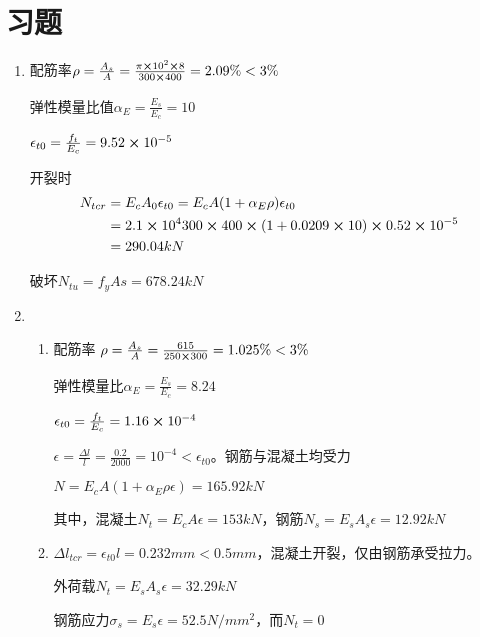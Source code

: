 \documentclass{article}
\begin{document}
\section{习题}
\begin{questionList} %
      \setcounter{enumi}{3}
      \item  \begin{enumerate}
            \item  配筋率$\rho=\frac{A_s}{A}=\frac{\pi\cross 10^2\cross 8}{300\cross 400}=2.09\%<3\%$
                  \par 弹性模量比值$\alpha_E=\frac{E_s}{E_c}=10$
                  \par $\epsilon_{t0}=\frac{f_t}{E_c}=9.52\cross10^{-5}$
                  \par 开裂时
                  \begin{align*}
                        N_{tcr} & = E_cA_0\epsilon_{t0}=E_cA(1+\alpha_E\rho)\epsilon_{t0}                     \\
                                & = 2.1\cross10^4300\cross400\cross(1+0.0209\cross10)\cross0.52\cross 10^{-5} \\
                                & = 290.04kN
                  \end{align*}
                  \par 破坏$N_{tu}=f_yAs=678.24kN$
            \item \begin{enumerate}
                        \item 配筋率 $\rho = \frac{A_s}{A}=\frac{615}{250\cross300}=1.025\%<3\%$
                              \par 弹性模量比$\alpha_E=\frac{E_s}{E_c}=8.24$
                              \par $\epsilon_{t0}=\frac{f_t}{E_c}=1.16\cross10^{-4}$
                              \par $\epsilon=\frac{\Delta l}{l}=\frac{0.2}{2000}=10^{-4}<\epsilon_{t0}$。钢筋与混凝土均受力
                              \par $N=E_cA(1+\alpha_E\rho\epsilon)=165.92kN$
                              \par 其中，混凝土$N_t=E_cA\epsilon=153kN$，钢筋$N_s=E_sA_s\epsilon=12.92kN$
                        \item $\Delta l_{tcr}=\epsilon_{t0}l=0.232mm<0.5mm$，混凝土开裂，仅由钢筋承受拉力。
                              \par 外荷载$N_t=E_sA_s\epsilon=32.29kN$
                              \par 钢筋应力$\sigma_s=E_s\epsilon=52.5N/mm^2$，而$N_t=0$

\end{enumerate}
\end{enumerate}
\end{questionList}
\end{document}

